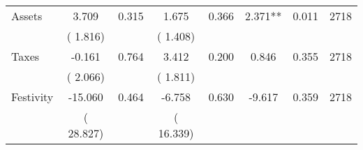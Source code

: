 \begin{tabular}{l*{7}{c}}
 Assets       &              3.709       &        0.315  &              1.675       &        0.366  &              2.371**       &              0.011 &  2718 \\ 
                       &       (       1.816)             &                               &       (       1.408)                     &                               &                                               &                                &                      \\ 

 Taxes       &             -0.161       &        0.764  &              3.412       &        0.200  &              0.846       &              0.355 &  2718 \\ 
                       &       (       2.066)             &                               &       (       1.811)                     &                               &                                               &                                &                      \\ 

 Festivity       &            -15.060       &        0.464  &             -6.758       &        0.630  &             -9.617       &              0.359 &  2718 \\ 
                       &       (      28.827)             &                               &       (      16.339)                     &                               &                                               &                                &                      \\ 

\hline \end{tabular}